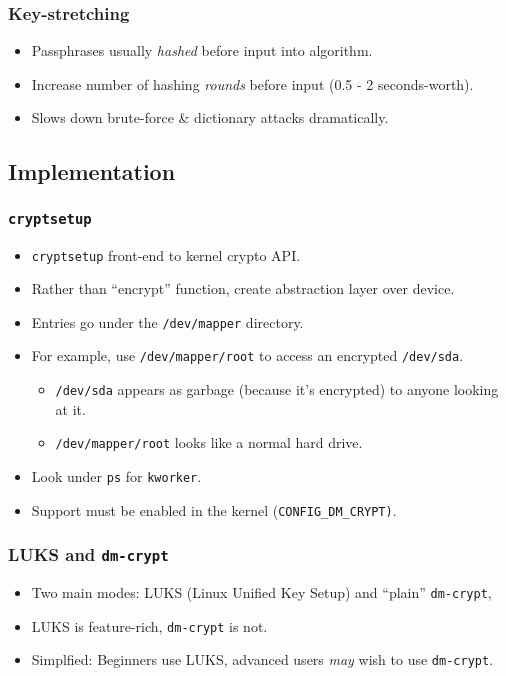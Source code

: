 \documentclass[xcolor={dvipsnames,svgnames},hyperref=dvips]{beamer}
\begin{document}
	\begin{frame}
		\frametitle{Key-stretching}
		\begin{itemize}
		\item Passphrases usually \textit{hashed} before input into algorithm.
		\item Increase number of hashing \textit{rounds} before input (0.5 - 2 seconds-worth).
		\item Slows down brute-force \& dictionary attacks dramatically.
		\end{itemize}
	\end{frame}

	\subsection{Implementation}
	\begin{frame}
		\frametitle{\texttt{cryptsetup}}
		\begin{itemize}
		\item \texttt{cryptsetup} front-end to kernel crypto API.
		\item Rather than ``encrypt'' function, create abstraction layer over device.
		\item Entries go under the \texttt{/dev/mapper} directory.
		\item For example, use \texttt{/dev/mapper/root} to access an encrypted \texttt{/dev/sda}.
			\begin{itemize}
			\item \texttt{/dev/sda} appears as garbage (because it's encrypted) to anyone looking at it.
			\item \texttt{/dev/mapper/root} looks like a normal hard drive.
			\end{itemize}
		\item Look under \texttt{ps} for \texttt{kworker}.
		\item Support must be enabled in the kernel (\texttt{CONFIG\_DM\_CRYPT)}.
		\end{itemize}
	\end{frame}

	\begin{frame}
		\frametitle{LUKS and \texttt{dm-crypt}}
		\begin{itemize}
		\item Two main modes: LUKS (Linux Unified Key Setup) and ``plain'' \texttt{dm-crypt},
		\item LUKS is feature-rich, \texttt{dm-crypt} is not.
		\item Simplfied: Beginners use LUKS, advanced users \textit{may} wish to use \texttt{dm-crypt}.
		\end{itemize}
	\end{frame}
\end{document}
